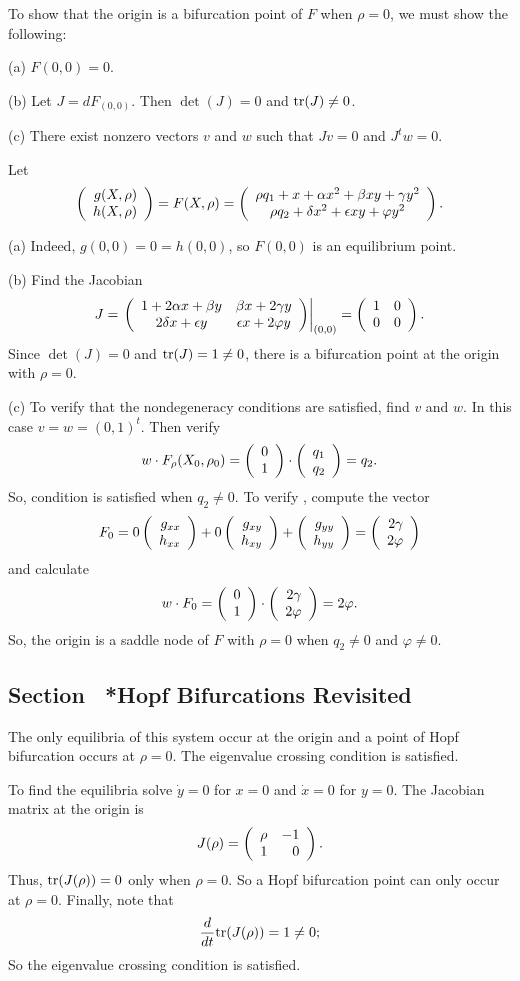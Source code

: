 \documentclass{ximera}
\begin{document}
To show that the origin is a bifurcation point of $F$ when $\rho = 0$, we
must show the following:

(a) $F(0,0) = 0$.

(b) Let $J = dF_{(0,0)}$.  Then $\det(J) = 0$ and ${\rm tr}(J) \neq 0$.

(c) There exist nonzero vectors $v$ and $w$ such that $Jv = 0$ and
$J^tw = 0$.

\soln Let
\[
\left(\begin{array}{r} g(X,\rho) \\ h(X,\rho)\end{array}\right) = F(X,\rho) = 
\left(\begin{array}{c} \rho q_1 + x + \alpha x^2 + \beta xy + \gamma y^2 \\ \rho q_2 + \delta x^2 + \epsilon xy + \varphi y^2\end{array}\right).
\]

(a) Indeed, $g(0,0) = 0 = h(0,0)$, so $F(0,0)$ is an equilibrium point.

(b) Find the Jacobian
\[
J = \left.\left(\begin{array}{cc} 1 + 2\alpha x + \beta y & \beta x + 2\gamma y\\ 2\delta x + \epsilon y &\epsilon x + 2\varphi y\end{array}\right)\right|_{(0,0)} =
\left(\begin{array}{rr} 1 & 0\\ 0 &0\end{array}\right).
\]
Since $\det(J) = 0$ and ${\rm tr}(J) = 1 \neq 0$, there
is a bifurcation point at the origin with $\rho = 0$.

(c)  To verify that the nondegeneracy conditions are satisfied, find $v$
and $w$.  In this case $v = w = (0,1)^t$.  Then verify
\[
w \cdot F_\rho(X_0,\rho_0) = \left(\begin{array}{r} 0 \\ 1\end{array}\right) \cdot \left(\begin{array}{r} q_1 \\ q_2\end{array}\right)
= q_2.
\]
So, condition  is satisfied when $q_2 \neq 0$.  To
verify , compute the vector
\[
F_0 = 0\left(\begin{array}{r} g_{xx} \\ h_{xx}\end{array}\right) + 0\left(\begin{array}{r} g_{xy} \\ h_{xy}\end{array}\right) +
\left(\begin{array}{r} g_{yy} \\ h_{yy}\end{array}\right) = \left(\begin{array}{r} 2\gamma \\ 2\varphi\end{array}\right)
\]
and calculate
\[
w \cdot F_0 = \left(\begin{array}{r} 0 \\ 1\end{array}\right) \cdot \left(\begin{array}{r} 2\gamma \\ 2\varphi\end{array}\right)
= 2\varphi.
\]
So, the origin is a saddle node of $F$ with $\rho = 0$ when
$q_2 \neq 0$ and $\varphi \neq 0$.



\subsection*{Section~\protect{\ref{S:HopfBif}} *Hopf Bifurcations Revisited}


\ans The only equilibria of this system occur at the origin and a point of
Hopf bifurcation occurs at $\rho=0$.  The eigenvalue crossing condition is
satisfied.

\soln  To find the equilibria solve $\dot{y}=0$ for $x=0$ and $\dot{x}=0$ for
$y=0$.  The Jacobian matrix at the origin is 
\[
J(\rho) = \left(\begin{array}{rr} \rho & -1\\ 1 &0\end{array}\right).
\]
Thus, ${\rm tr}(J(\rho))=0$ only when $\rho=0$.  So a Hopf bifurcation point
can only occur at $\rho=0$.  Finally, note that 
\[
\frac{d}{dt}{\rm tr}(J(\rho)) = 1 \neq 0;
\]
So the eigenvalue crossing condition is satisfied.
\end{document}
